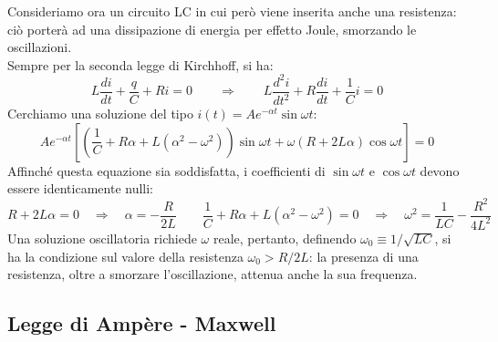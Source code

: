 Consideriamo ora un circuito LC in cui però viene inserita anche una resistenza: ciò porterà ad una dissipazione di energia per effetto Joule, smorzando le oscillazioni. \\ 
Sempre per la seconda legge di Kirchhoff, si ha:
\begin{equation}
	L \frac{di}{dt} + \frac{q}{C} + Ri = 0 \qquad\Longrightarrow\qquad L \frac{d^2 i}{dt^2} + R \frac{di}{dt} + \frac{1}{C} i = 0
	\label{eq:43}
\end{equation}
Cerchiamo una soluzione del tipo $ i(t) = A e^{-\alpha t} \sin\omega t $:
\begin{equation}
	A e^{-\alpha t} \left[ \left( \frac{1}{C} + R\alpha + L(\alpha^2 - \omega^2)\right) \sin\omega t + \omega (R + 2L\alpha) \cos\omega t \right] = 0
	\label{eq:44}
\end{equation}
Affinché questa equazione sia soddisfatta, i coefficienti di $ \sin\omega t $ e $ \cos\omega t $ devono essere identicamente nulli:
\begin{equation}
	R + 2L\alpha = 0 \quad\Rightarrow\quad \alpha = -\frac{R}{2L} \qquad \frac{1}{C} + R\alpha + L (\alpha^2 - \omega^2) = 0 \quad\Rightarrow\quad \omega^2 = \frac{1}{LC} - \frac{R^2}{4L^2}
	\label{eq:45}
\end{equation}
Una soluzione oscillatoria richiede $ \omega $ reale, pertanto, definendo $ \omega_0 \equiv 1 / \sqrt{LC} $, si ha la condizione sul valore della resistenza $ \omega_0 > R / 2L $: la presenza di una resistenza, oltre a smorzare l'oscillazione, attenua anche la sua frequenza.

\subsection{Legge di Ampère - Maxwell}


